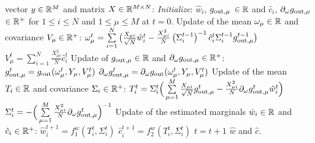 \documentclass[aip,jmp,amsmath,amssymb,reprint]{revtex4}
\begin{document}
\begin{algorithm} 
\begin{algorithmic}
     vector $y \in \mathbb{R}^M$ and matrix $X\in \mathbb{R}^{M \times N}$:
    \STATE \emph{Initialize}: $\hat{w}_i$, $g_{\rm out,\mu}$ $\in \mathbb{R}$ and $\hat{c}_i$, $\partial_{\omega} g_{\rm out , \mu}$ $\in \mathbb{R}^+$ for $ 1 \leq i \leq N $ and $ 1 \leq \mu \leq M $ at $t=0$.
    \REPEAT   
    \STATE Update of the mean $\omega_{\mu} \in \mathbb{R}$ and covariance $V_{\mu}\in \mathbb{R}^+$: \spacecase
    \hspace{0.5cm} $\omega_{\mu}^t = \sum\limits_{i = 1}^N \big(\frac{X_{\mu
      i}}{\sqrt{N}}\hat{w}_{i}^t -    \frac{X_{\mu
      i}^2}{N}
    \left(\Sigma_{i}^{t-1}\right)^{-1}\hat{c}_{i}^t \Sigma_{i
    }^{t-1}g_{\rm out,\mu}^{t-1} \big)  $  \spacecase
    \hspace{0.5cm} $V_{\mu}^t = \sum\limits_{i=1}^N\frac{X_{\mu
      i}^2}{N} \hat{c}_{i}^t $\spacecase
    \STATE Update of $g_{\rm out, \mu} \in \mathbb{R}$ and $\partial_{\omega} g_{\rm out , \mu} \in \mathbb{R}^+$: \spacecase
    \hspace{0.5cm}$g_{\rm out, \mu}^t = g_{\rm out} (\omega_{\mu}^t , Y_{\mu}, V_{\mu}^t) $ \spacecase
     \hspace{0.5cm} $ \partial_{\omega} g_{\rm out, \mu}^t = \partial_{\omega}  g_{\rm out} (\omega_{\mu}^t , Y_{\mu}, V_{\mu}^t)  $ \spacecase
    \STATE Update of the mean $T_i \in \mathbb{R}$ and covariance $\Sigma_i \in \mathbb{R}^+$:\spacecase
    \hspace{0.5cm}$T_i^t = \Sigma_{i}^t \Big(  \sum\limits_{\mu =1}^M
      \frac{X_{\mu
      i}}{\sqrt{N}}g_{\rm out,\mu}^t  -\frac{X_{\mu
      i}^2}{N}  \partial_{\omega} g_{\rm out , \mu}^t \hat{w}_{i}^t \Big) $ \spacecase 
      \hspace{0.5cm} $  \Sigma_{i}^t = -\Big(\sum\limits_{\mu =1}^M \frac{X_{\mu
      i}^2}{N}  \partial_\omega g_{\rm out,\mu}^t \Big)^{-1} $\spacecase
    \STATE Update of the estimated marginals $\hat{w}_i \in \mathbb{R}$ and $\hat{c}_i \in \mathbb{R}^+$: \spacecase
   \hspace{0.5cm}$\hat{w}_i^{t+1} = f_1^w( T_i^t,  \Sigma_i^t  ) $\spacecase
   \hspace{0.5cm}$   \hat{c}_i^{t+1} = f_2^w(T_i^t,  \Sigma_i^t  )$\spacecase
    \STATE ${t} = {t} + 1$ 
    $\hat{w}$ and $\hat{c}$.
\end{algorithmic}
\end{algorithm}
\end{document}
